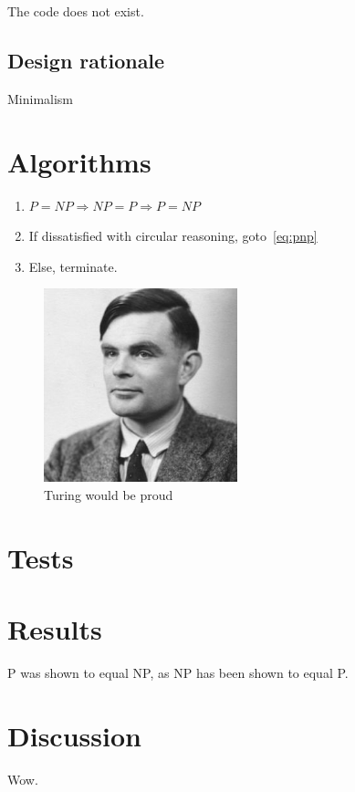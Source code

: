 \documentclass[a4paper, twoside]{article}
\begin{document}
The code does not exist.

\subsection{Design rationale} %

Minimalism

\section{Algorithms} %

\begin{enumerate}
\item \label{eq:pnp}$P=NP \Rightarrow NP=P \Rightarrow P=NP $
\item If dissatisfied with circular reasoning, goto~\ref{eq:pnp}
\item Else, terminate.
\end{enumerate}

\begin{figure}[h!]
  \centering
  \includegraphics[width=0.5\textwidth]{img/turing-portrait.jpg}
  \caption{Turing would be proud}
  \label{fig:turing}
\end{figure}

\section{Tests} %

\section{Results} %

P was shown to equal NP, as NP has been shown to equal P.

\section{Discussion} %

Wow.

\printbibliography
\end{document}

